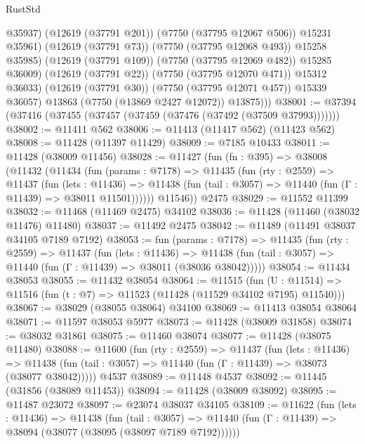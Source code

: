 \begin{lexlean}{RustStd}
\begin{coremodule}
                      @35937)
                    (@12619 (@37791 @201))
                    (@7750 (@37795 @12067 @506))
                    @15231
                    @35961)
                  (@12619 (@37791 @73))
                  (@7750 (@37795 @12068 @493))
                  @15258
                  @35985)
                (@12619 (@37791 @109))
                (@7750 (@37795 @12069 @482))
                @15285
                @36009)
              (@12619 (@37791 @22))
              (@7750 (@37795 @12070 @471))
              @15312
              @36033)
            (@12619 (@37791 @30))
            (@7750 (@37795 @12071 @457))
            @15339
            @36057)
          @13863
          (@7750 (@13869 @2427 @12072))
          @13875)))
@38001 := @37394 (@37416 (@37455 (@37457 (@37459 (@37476 (@37492 (@37509 @37993)))))))
@38002 := @11411 @562
@38006 := @11413 (@11417 @562) (@11423 @562)
@38008 := @11428 (@11397 @11429)
@38009 := @7185 @10433
@38011 := @11428 (@38009 @11456)
@38028 := @11427
    (fun (fn : @395) =>
    @38008
      (@11432
        (@11434
          (fun (params : @7178) =>
          @11435
            (fun (rty : @2559) =>
            @11437
              (fun (lets : @11436) =>
              @11438 (fun (tail : @3057) => @11440 (fun (Γ : @11439) => @38011 @11501))))))
        @11546))
    @2475
@38029 := @11552 @11399
@38032 := @11468 (@11469 @2475) @34102
@38036 := @11428 (@11460 (@38032 @11476) @11480)
@38037 := @11492 @2475
@38042 := @11489 (@11491 @38037 @34105 @7189 @7192)
@38053 := fun (params : @7178) =>
  @11435
    (fun (rty : @2559) =>
    @11437
      (fun (lets : @11436) =>
      @11438 (fun (tail : @3057) => @11440 (fun (Γ : @11439) => @38011 (@38036 @38042)))))
@38054 := @11434 @38053
@38055 := @11432 @38054
@38064 := @11515
    (fun (U : @11514) => @11516 (fun (t : @7) => @11523 (@11428 (@11529 @34102 @7195) @11540)))
@38067 := @38029 (@38055 @38064) @34100
@38069 := @11413 @38054 @38064
@38071 := @11597 @38053 @5977
@38073 := @11428 (@38009 @31858)
@38074 := @38032 @31861
@38075 := @11460 @38074
@38077 := @11428 (@38075 @11480)
@38088 := @11600
    (fun (rty : @2559) =>
    @11437
      (fun (lets : @11436) =>
      @11438 (fun (tail : @3057) => @11440 (fun (Γ : @11439) => @38073 (@38077 @38042)))))
    @4537
@38089 := @11448 @4537
@38092 := @11445 (@31856 (@38089 @11453))
@38094 := @11428 (@38009 @38092)
@38095 := @11487 @23072
@38097 := @23074 @38037 @34105
@38109 := @11622
    (fun (lets : @11436) =>
    @11438
      (fun (tail : @3057) =>
      @11440 (fun (Γ : @11439) => @38094 (@38077 (@38095 (@38097 @7189 @7192))))))

\end{coremodule}
\end{lexlean}
